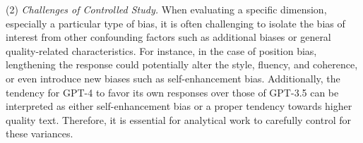\documentclass[acmsmall,screen]{acmart}
\begin{document}
(2) \textit{Challenges of Controlled Study.} 
When evaluating a specific dimension, especially a particular type of bias, it is often challenging to isolate the bias of interest from other confounding factors such as additional biases or general quality-related characteristics.
For instance, in the case of position bias, lengthening the response could potentially alter the style, fluency, and coherence, or even introduce new biases such as self-enhancement bias. 
Additionally, the tendency for GPT-4 to favor its own responses over those of GPT-3.5 can be interpreted as either self-enhancement bias or a proper tendency towards higher quality text.
Therefore, it is essential for analytical work to carefully control for these variances.







\end{document}
